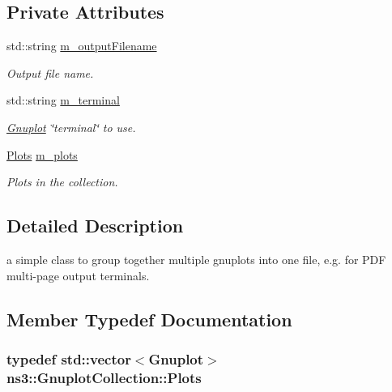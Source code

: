 \subsection*{Private Attributes}
\begin{DoxyCompactItemize}
\item 
std\+::string \hyperlink{classns3_1_1GnuplotCollection_a02b6f2688f131929843ea36ad704f7dd}{m\+\_\+output\+Filename}
\begin{DoxyCompactList}\small\item\em Output file name. \end{DoxyCompactList}\item 
std\+::string \hyperlink{classns3_1_1GnuplotCollection_a99f22d3959512c75b8089649a55af086}{m\+\_\+terminal}
\begin{DoxyCompactList}\small\item\em \hyperlink{classns3_1_1Gnuplot}{Gnuplot} \char`\"{}terminal\char`\"{} to use. \end{DoxyCompactList}\item 
\hyperlink{classns3_1_1GnuplotCollection_ac5dafa4a42829b1a88be9b21cb770544}{Plots} \hyperlink{classns3_1_1GnuplotCollection_ab7d2ec530bb8d40492f6dfc44092cd1c}{m\+\_\+plots}
\begin{DoxyCompactList}\small\item\em Plots in the collection. \end{DoxyCompactList}\end{DoxyCompactItemize}


\subsection{Detailed Description}
a simple class to group together multiple gnuplots into one file, e.\+g. for P\+DF multi-\/page output terminals. 

\subsection{Member Typedef Documentation}
\subsubsection[{\texorpdfstring{Plots}{Plots}}]{\setlength{\rightskip}{0pt plus 5cm}typedef std\+::vector$<${\bf Gnuplot}$>$ {\bf ns3\+::\+Gnuplot\+Collection\+::\+Plots}\hspace{0.3cm}{\ttfamily [private]}}\hypertarget{classns3_1_1GnuplotCollection_ac5dafa4a42829b1a88be9b21cb770544}{}\label{classns3_1_1GnuplotCollection_ac5dafa4a42829b1a88be9b21cb770544}


